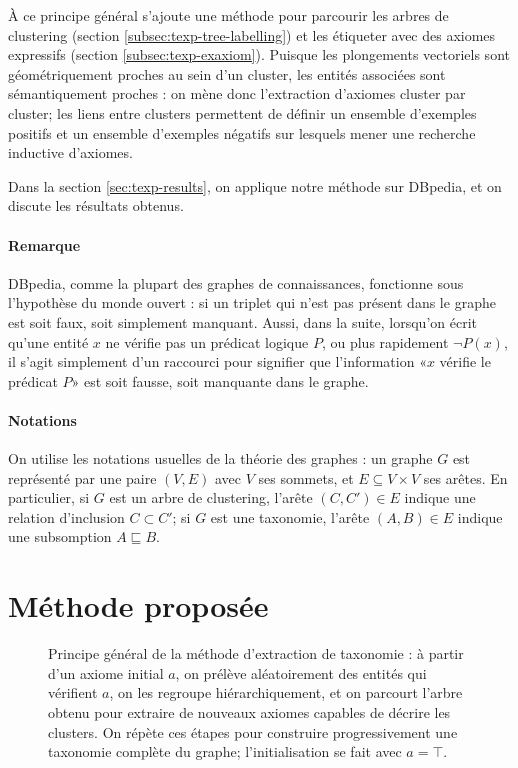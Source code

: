 À ce principe général s'ajoute une méthode pour parcourir les arbres de clustering (section \ref{subsec:texp-tree-labelling}) et les étiqueter avec des axiomes expressifs (section \ref{subsec:texp-exaxiom}). Puisque les plongements vectoriels sont géométriquement proches au sein d'un cluster, les entités associées sont sémantiquement proches : on mène donc l'extraction d'axiomes cluster par cluster; les liens entre clusters permettent de définir un ensemble d'exemples positifs et un ensemble d'exemples négatifs sur lesquels mener une recherche inductive d'axiomes.


Dans la section \ref{sec:texp-results}, on applique notre méthode sur DBpedia, et on discute les résultats obtenus.
 

\paragraph{Remarque}

DBpedia, comme la plupart des graphes de connaissances, fonctionne sous l’hypothèse
du monde ouvert : si un triplet qui n'est pas présent dans le graphe est soit faux, soit simplement manquant. Aussi, dans la suite, lorsqu'on écrit qu'une entité $x$ ne vérifie pas un prédicat logique $P$, ou plus rapidement $\neg P(x)$, il s'agit simplement d'un raccourci pour signifier que l'information «$x$ vérifie le prédicat $P$» est soit fausse, soit manquante dans le graphe.


\paragraph{Notations}

On utilise les notations usuelles de la théorie des graphes : un graphe $G$ est représenté par une paire $(V, E)$ avec $V$ ses sommets, et $E \subseteq V \times V$ ses arêtes. En particulier, si $G$ est un arbre de clustering, l'arête $(C, C') \in E$ indique une relation d'inclusion $C \subset C'$; si $G$ est une taxonomie, l'arête $(A, B) \in E$ indique une subsomption $A \sqsubseteq B$. %

\section{Méthode proposée}

\begin{figure}[h]
    \centering
    
    \caption[Aperçu de la méthode d'extraction de taxonomie expressive]{Principe général de la méthode d'extraction de taxonomie : à partir d'un axiome initial $a$, on prélève aléatoirement des entités qui vérifient $a$, on les regroupe hiérarchiquement, et on parcourt l'arbre obtenu pour extraire de nouveaux axiomes capables de décrire les clusters. On répète ces étapes pour construire progressivement une taxonomie complète du graphe; l'initialisation se fait avec $a = \top$.}
    \label{fig:texp-overview}
\end{figure}

